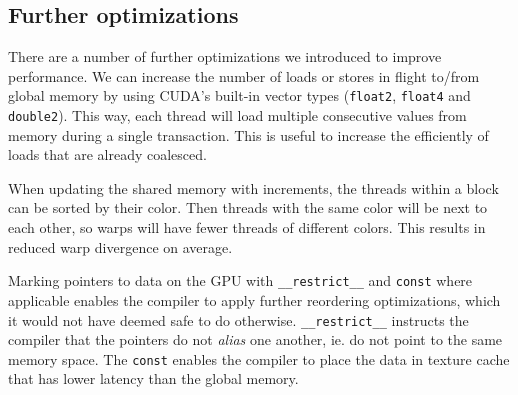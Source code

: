 \subsection{Further optimizations}\label{optimisations}

\noindent There are a number of further optimizations we introduced to improve
performance. We can increase the number of loads or stores in flight 
to/from global memory by using CUDA's built-in vector types 
(\lstinline!float2!, \lstinline!float4! and \lstinline!double2!). This way, 
each thread will load multiple consecutive values from memory during a single 
transaction. This is useful to increase the efficiently of loads that are 
already coalesced.

When updating the shared memory with increments, the threads within a block can 
be sorted by their color. Then threads with the same color will be next to each 
other, so warps will have fewer threads of different colors. This results in 
reduced warp divergence on average.

Marking pointers to data on the GPU with \lstinline!__restrict__! and 
\lstinline!const! where applicable enables the compiler to apply further 
reordering optimizations, which it would not have deemed safe to do otherwise. 
\lstinline!__restrict__! instructs the compiler that the pointers do not 
\emph{alias} one another, ie. do not point to the same memory space. The 
\lstinline!const! enables the compiler to place the data in texture cache that 
has lower latency than the global memory.

